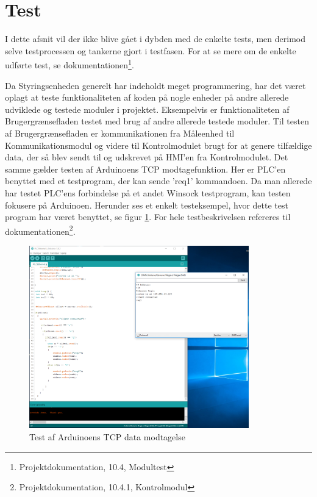 
\section{Test}

I dette afsnit vil der ikke blive gået i dybden med de enkelte tests, men derimod selve testprocessen og tankerne gjort i testfasen. For at se mere om de enkelte udførte test, se dokumentationen\footnote{Projektdokumentation, 10.4, Modultest}.

Da Styringsenheden generelt har indeholdt meget programmering, har det været oplagt at teste funktionaliteten af koden på nogle enheder på andre allerede udviklede og testede moduler i projektet.  Eksempelvis er funktionaliteten af Brugergrænsefladen testet med brug af andre allerede testede moduler. Til testen af Brugergrænsefladen er kommunikationen fra Måleenhed til Kommunikationsmodul og videre til Kontrolmodulet brugt for at genere tilfældige data, der så blev sendt til og udskrevet på HMI'en fra Kontrolmodulet. Det samme gælder testen af Arduinoens TCP modtagefunktion. Her er PLC'en benyttet  med et testprogram, der kan sende 'req1' kommandoen. Da man allerede har testet PLC'ens forbindelse på et andet Winsock testprogram, kan testen fokusere på Arduinoen. Herunder ses et enkelt testeksempel, hvor dette test program har været benyttet, se figur \ref{fig:EthernetTest}. For hele testbeskrivelsen refereres til dokumentationen\footnote{Projektdokumentation, 10.4.1, Kontrolmodul}.


\begin{figure}[H] %
	\centering
	\includegraphics[width=0.85\textwidth]{figure/EthernetTest}
	\caption{Test af Arduinoens TCP data modtagelse}
	\label{fig:EthernetTest}
\end{figure}


